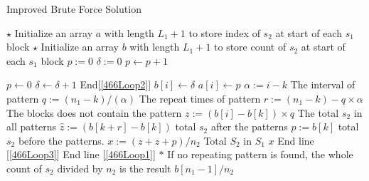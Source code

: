 \begin{algorithm}[H]
\caption{Improved Brute Force Solution}
\begin{algorithmic}[1]
\State $\star$ Initialize an array $a$ with length $L_1+1$ to store index of $s_2$ at start of each $s_1$ block
\State $\star$ Initialize an array $b$ with length $L_1+1$ to store count of $s_2$ at start of each $s_1$ block
\State $p := 0$
\State $\delta := 0$
 \label{466Loop1}
 \label{466Loop2}
\State $p\gets p+1$
\EndIf
{}
\end{algorithmic}
\end{algorithm}
\begin{algorithm}[H]
\begin{algorithmic}[1]
\State $p \gets 0$
\State $\delta \gets \delta + 1$
\EndIf
\EndFor \Comment End[\ref{466Loop2}]
\State $b[i] \gets \delta$
\State $a[i] \gets p$
 \label{466Loop3}
\State $\alpha := i - k$ \Comment The interval of pattern
\State $q := (n_1-k)/(\alpha)$ \Comment The repeat times of pattern
\State $r := (n_1-k) - q \times \alpha$ \Comment The blocks does not contain the pattern
\State $z := (b[i]-b[k])\times q$ \Comment The total $s_2$ in all patterns
\State $\hat{z}:=(b[k+r] - b[k])$ \Comment total $s_2$ after the patterns
\State $p:=b[k]$ \Comment total $s_2$ before the patterns.
\State $x:=(z+\hat{z}+p) / n_2$ \Comment Total $S_2$ in $S_1$
\State \Return $x$
\EndIf
\EndFor \Comment End line [\ref{466Loop3}]
\EndFor \Comment End line [\ref{466Loop1}]
\State $\ast$ If no repeating pattern is found, the whole count of $s_2$ divided by $n_2$ is the result
\State \Return $b[n_1-1]/n_2$
\EndProcedure
\end{algorithmic}
\end{algorithm}


